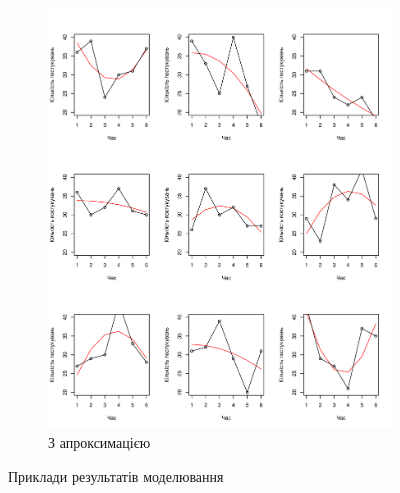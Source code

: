 \begin{figure}[h]
\begin{subfigure}[b]{0.45\textwidth}
    \includegraphics[width=\textwidth]{code/least_squares_approximation}
    \caption{З апроксимацією}
    \label{fig:tapping:poisson:sqr}
  \end{subfigure}
  \caption{Приклади результатів моделювання}
\end{figure}

